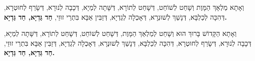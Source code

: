 וְאָתָא מַלְאָךְ הַמָּוֶת וְשָׁחַט לְשׁוֹחֵט, דְּשָׁחַט לְתוֹרָא, דְּשָּׁתָה לְמַיָא, דְּכָבָה לְנוּרָא, דְּשָׂרַף לְחוּטְרָא, דְּהִכָּה לְכַלְבָּא, דְּנָשַׁךְ לְשׁוּנְרָא, דְּאָכְלָה לְגַדְיָא, דְּזַבִּין אַבָּא בִּתְרֵי זוּזֵי,   
{\bfseries
חַד גַּדְיָא, חַד גַּדְיָא.
}\vspace{1em}

וְאָתָא הַקָּדוֹשׁ בָּרוּךְ הוּא וְשָׁחַט לְמַלְאַךְ הַמָּוֶת, דְּשָׁחַט לְשׁוֹחֵט, דְּשָׁחַט לְתוֹרָא, דְּשָּׁתָה לְמַיָא, דְּכָבָה לְנוּרָא, דְּשָׂרַף לְחוּטְרָא, דְּהִכָּה לְכַלְבָּא, דְּנָשַׁךְ לְשׁוּנְרָא, דְּאָכְלָה לְגַדְיָא, דְּזַבִּין אַבָּא בִּתְרֵי זוּזֵי,   
{\bfseries
חַד גַּדְיָא, חַד גַּדְיָא.
}\\ \vspace{1em}

\vfill

\break

